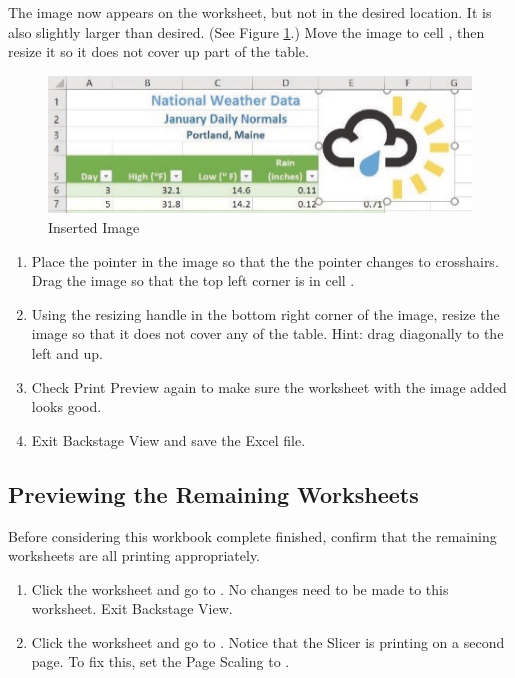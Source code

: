 The image now appears on the worksheet, but not in the desired location. It is also slightly larger than desired. (See Figure \ref{05:fig29}.) Move the image to cell , then resize it so it does not cover up part of the table.

\begin{figure}[H]
	\centering
	\includegraphics[width=\maxwidth{.95\linewidth}]{gfx/ch05_fig29}
	\caption{Inserted Image}
	\label{05:fig29}
\end{figure}

\begin{enumerate}
	\item Place the pointer in the image so that the the pointer changes to crosshairs. Drag the image so that the top left corner is in cell .
	\item Using the resizing handle in the bottom right corner of the image, resize the image so that it does not cover any of the table. Hint: drag diagonally to the left and up.
	\item Check Print Preview again to make sure the worksheet with the image added looks good.
\item Exit Backstage View and save the Excel file.
\end{enumerate}

\subsection{Previewing the Remaining Worksheets}

Before considering this workbook complete finished, confirm that the remaining worksheets are all printing appropriately.

\begin{enumerate}
	\item Click the  worksheet and go to . No changes need to be made to this worksheet. Exit Backstage View.
	\item Click the  worksheet and go to . Notice that the Slicer is printing on a second page. To fix this, set the Page Scaling to .
\end{enumerate}

